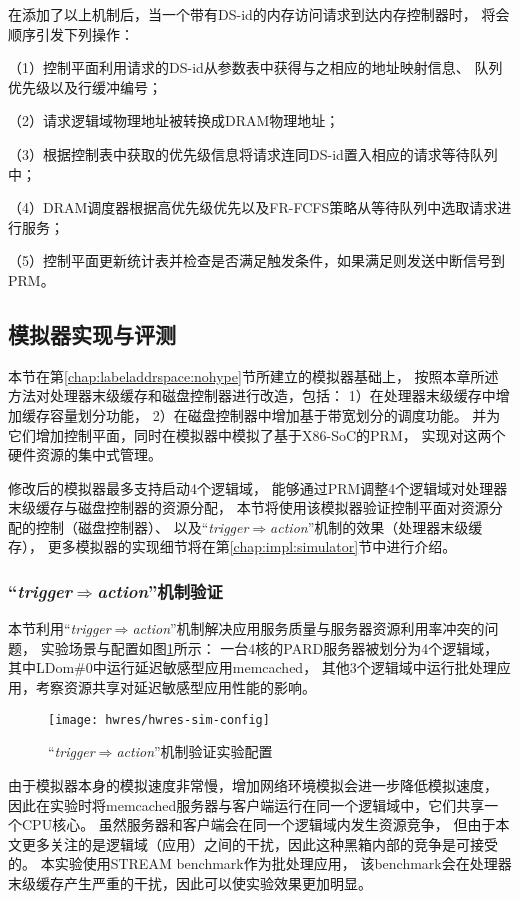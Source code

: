 在添加了以上机制后，当一个带有DS-id的内存访问请求到达内存控制器时，
将会顺序引发下列操作：

（1）控制平面利用请求的DS-id从参数表中获得与之相应的地址映射信息、
队列优先级以及行缓冲编号；

（2）请求逻辑域物理地址被转换成DRAM物理地址；

（3）根据控制表中获取的优先级信息将请求连同DS-id置入相应的请求等待队列中；

（4）DRAM调度器根据高优先级优先以及FR-FCFS\cite{rixner_memory_2000}策略从等待队列中选取请求进行服务；

（5）控制平面更新统计表并检查是否满足触发条件，如果满足则发送中断信号到PRM。


\subsection{模拟器实现与评测}

本节在第\ref{chap:labeladdrspace:nohype}节所建立的模拟器基础上，
按照本章所述方法对处理器末级缓存和磁盘控制器进行改造，包括：
1）在处理器末级缓存中增加缓存容量划分功能，
2）在磁盘控制器中增加基于带宽划分的调度功能。
并为它们增加控制平面，同时在模拟器中模拟了基于X86-SoC的PRM，
实现对这两个硬件资源的集中式管理。

修改后的模拟器最多支持启动4个逻辑域，
能够通过PRM调整4个逻辑域对处理器末级缓存与磁盘控制器的资源分配，
本节将使用该模拟器验证控制平面对资源分配的控制（磁盘控制器）、
以及``\emph{trigger$\Rightarrow$action}''机制的效果（处理器末级缓存），
更多模拟器的实现细节将在第\ref{chap:impl:simulator}节中进行介绍。


\subsubsection{``\emph{trigger$\Rightarrow$action}''机制验证}

本节利用``\emph{trigger$\Rightarrow$action}''机制解决应用服务质量与服务器资源利用率冲突的问题，
实验场景与配置如图\ref{fig:hwres-sim-config}所示：
一台4核的PARD服务器被划分为4个逻辑域，其中LDom\#0中运行延迟敏感型应用memcached，
其他3个逻辑域中运行批处理应用，考察资源共享对延迟敏感型应用性能的影响。

\begin{figure}[tb]
  \centering
  \texttt{[image: hwres/hwres-sim-config]}
  \caption{``\emph{trigger$\Rightarrow$action}''机制验证实验配置}
  \label{fig:hwres-sim-config}
\end{figure}

由于模拟器本身的模拟速度非常慢，增加网络环境模拟会进一步降低模拟速度，
因此在实验时将memcached服务器与客户端运行在同一个逻辑域中，它们共享一个CPU核心。
虽然服务器和客户端会在同一个逻辑域内发生资源竞争，
但由于本文更多关注的是逻辑域（应用）之间的干扰，因此这种黑箱内部的竞争是可接受的。
本实验使用STREAM benchmark\cite{stream}作为批处理应用，
该benchmark会在处理器末级缓存产生严重的干扰，因此可以使实验效果更加明显。

